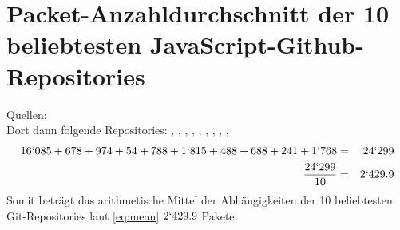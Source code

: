 \section{Packet-Anzahldurchschnitt der 10 beliebtesten JavaScript-Github-Repositories} \label{sec:PackageMeanPopGitJsRepos}
    Quellen: \cite{link:GitPopJsRepoMostWanted}
    \\
    Dort dann folgende Repositories: \cite{link:GitPopJsRepoReact}, \cite{link:GitPopJsRepoLeaflet}, \cite{link:GitPopJsRepoBootstrap}, \cite{link:GitPopJsRepoExpress}, \cite{link:GitPopJsRepoSwiper}, \cite{link:GitPopJsRepoPlotly}, \cite{link:GitPopJsRepoNode}, \cite{link:GitPopJsRepoAos}, \cite{link:GitPopJsRepoPm2}, \cite{link:GitPopJsRepoAxios}
    \begin{eqnarray}
        16`085 + 678 + 974 + 54 + 788 + 1`815 + 488 + 688 + 241 + 1`768 &=& 24`299
        \label{eq:summe} \\
        \frac{24`299}{10} &=& 2`429.9
        \label{eq:mean}
    \end{eqnarray}
    Somit beträgt das arithmetische Mittel der Abhängigkeiten der 10 beliebtesten Git-Repositories laut \eqref{eq:mean} $2`429.9$ Pakete.

